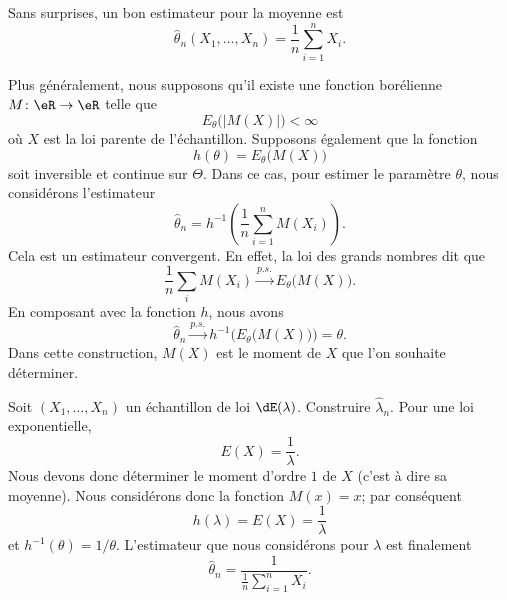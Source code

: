 Sans surprises, un bon estimateur pour la moyenne est
\begin{equation}
    \hat\theta_n(X_1,\ldots,X_n)=\frac{1}{ n }\sum_{i=1}^nX_i.
\end{equation}

Plus généralement, nous supposons qu'il existe une fonction borélienne \( M\colon \eR\to \eR\) telle que
\begin{equation}
    E_{\theta}\big( | M(X) | \big)<\infty
\end{equation}
où \( X\) est la loi parente de l'échantillon. Supposons également que la fonction 
\begin{equation}
    h(\theta)=E_{\theta}\big( M(X) \big)
\end{equation}
soit inversible et continue sur \( \Theta\). Dans ce cas, pour estimer le paramètre \( \theta\), nous considérons l'estimateur
\begin{equation}
    \hat\theta_n=h^{-1}\left( \frac{1}{ n }\sum_{i=1}^nM(X_i) \right).
\end{equation}
Cela est un estimateur convergent. En effet, la loi des grands nombres dit que
\begin{equation}
    \frac{1}{ n }\sum_iM(X_i)\stackrel{p.s.}{\longrightarrow}E_{\theta}\big( M(X) \big).
\end{equation}
En composant avec la fonction \( h\), nous avons
\begin{equation}
    \hat\theta_n\stackrel{p.s.}{\longrightarrow}h^{-1}\Big( E_{\theta}\big( M(X) \big) \Big)=\theta.
\end{equation}
Dans cette construction, \( M(X)\) est le moment de \( X\) que l'on souhaite déterminer.

\begin{example}
    Soit \( (X_1,\ldots,X_n)\) un échantillon de loi \( \dE(\lambda)\). Construire \( \hat\lambda_n\). Pour une loi exponentielle,
    \begin{equation}
        E(X)=\frac{1}{ \lambda }.
    \end{equation}
    Nous devons donc déterminer le moment d'ordre \( 1\) de \( X\) (c'est à dire sa moyenne). Nous considérons donc la fonction \( M(x)=x\); par conséquent
    \begin{equation}
        h(\lambda)=E(X)=\frac{1}{ \lambda }
    \end{equation}
    et \( h^{-1}(\theta)=1/\theta\). L'estimateur que nous considérons pour \( \lambda\) est finalement
    \begin{equation}
        \hat\theta_n=\frac{1}{ \frac{1}{ n }\sum_{i=1}^nX_i }.
    \end{equation}
\end{example}

